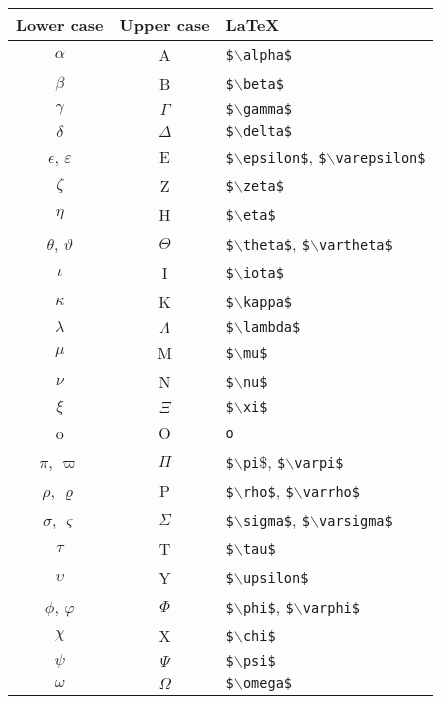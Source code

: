\documentclass[12pt,a4paper]{article}
\begin{document}
\begin{tabular}{ccp{4cm}}
\toprule
Lower case & Upper case & \LaTeX \\
\midrule
$\alpha$   & A          & \texttt{\$$\backslash$alpha\$} \\
$\beta$    & B          & \texttt{\$$\backslash$beta\$}  \\
$\gamma$   & $\Gamma$   & \texttt{\$$\backslash$gamma\$} \\
$\delta$   & $\Delta$   & \texttt{\$$\backslash$delta\$} \\
$\epsilon$, $\varepsilon$ & E          & \texttt{\$$\backslash$epsilon\$},  \texttt{\$$\backslash$varepsilon\$} \\
$\zeta$    & Z          & \texttt{\$$\backslash$zeta\$} \\
$\eta$     & H          & \texttt{\$$\backslash$eta\$} \\
$\theta$, $\vartheta$ & $\Theta$   & \texttt{\$$\backslash$theta\$}, \texttt{\$$\backslash$vartheta\$} \\
$\iota$    & I          & \texttt{\$$\backslash$iota\$} \\
$\kappa$   & K          & \texttt{\$$\backslash$kappa\$} \\
$\lambda$  & $\Lambda$  & \texttt{\$$\backslash$lambda\$} \\
$\mu$      & M          & \texttt{\$$\backslash$mu\$} \\
$\nu$      & N          & \texttt{\$$\backslash$nu\$} \\
$\xi$      & $\Xi$      & \texttt{\$$\backslash$xi\$} \\
o          & O          & \texttt{o} \\
$\pi$, $\varpi$  & $\Pi$ & \texttt{\$$\backslash$pi}\$, \texttt{\$$\backslash$varpi\$} \\
$\rho$, $\varrho$ & P          & \texttt{\$$\backslash$rho\$}, \texttt{\$$\backslash$varrho\$} \\
$\sigma$, $\varsigma$   & $\Sigma$   & \texttt{\$$\backslash$sigma\$}, \texttt{\$$\backslash$varsigma\$} \\
$\tau$     & T          & \texttt{\$$\backslash$tau\$} \\
$\upsilon$ & Y          & \texttt{\$$\backslash$upsilon\$} \\
$\phi$, $\varphi$  & $\Phi$     & \texttt{\$$\backslash$phi\$}, \texttt{\$$\backslash$varphi\$} \\
$\chi$     & X          & \texttt{\$$\backslash$chi\$} \\
$\psi$     & $\Psi$     & \texttt{\$$\backslash$psi\$} \\
$\omega$   & $\Omega$   & \texttt{\$$\backslash$omega\$} \\
\bottomrule
\end{tabular}
\end{document}

